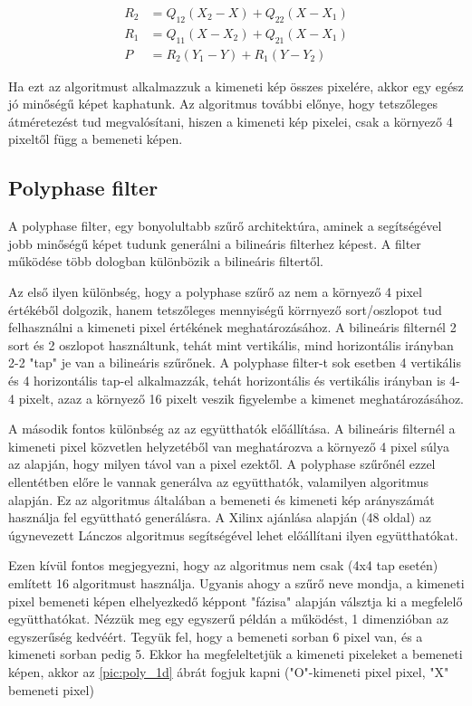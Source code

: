\begin{align}		
	R_2 &= Q_{12} \left(X_2-X\right) + Q_{22} \left(X-X_1\right) \\
	R_1 &= Q_{11} \left(X-X_2\right) + Q_{21} \left(X-X_1\right)\\
	P &= R_2 \left(Y_1-Y\right) + R_1 \left(Y-Y_2\right)
	\label{eq:mult}
\end{align}

Ha ezt az algoritmust alkalmazzuk a kimeneti kép összes pixelére, akkor egy egész jó minőségű képet kaphatunk. Az algoritmus további előnye, hogy tetszőleges átméretezést tud megvalósítani, hiszen a kimeneti kép pixelei, csak a környező 4 pixeltől függ a bemeneti képen.

\subsection{Polyphase filter}

A polyphase filter, egy bonyolultabb szűrő architektúra, aminek a segítségével jobb minőségű képet tudunk generálni a bilineáris filterhez képest. A filter működése több dologban különbözik a bilineáris filtertől. 

Az első ilyen különbség, hogy a polyphase szűrő az nem a környező 4 pixel értékéből dolgozik, hanem tetszőleges mennyiségű körrnyező sort/oszlopot tud felhasználni a kimeneti pixel értékének meghatározásához. A bilineáris filternél 2 sort és 2 oszlopot használtunk, tehát mint vertikális, mind horizontális irányban 2-2 "tap" je van a bilineáris szűrőnek. A polyphase filter-t sok esetben 4 vertikális és 4 horizontális tap-el alkalmazzák, tehát horizontális és vertikális irányban is 4-4 pixelt, azaz a környező 16 pixelt veszik figyelembe a kimenet meghatározásához. 

A második fontos különbség az az együtthatók előállítása. A bilineáris filternél a kimeneti pixel közvetlen helyzetéből van meghatározva a környező 4 pixel súlya az alapján, hogy milyen távol van a pixel ezektől. A polyphase szűrőnél ezzel ellentétben előre le vannak generálva az együtthatók, valamilyen algoritmus alapján. Ez az algoritmus általában a bemeneti és kimeneti kép arányszámát használja fel együttható generálásra. A Xilinx ajánlása alapján \cite{Xilinx_poly} (48 oldal) az úgynevezett Lánczos algoritmus segítségével lehet  előállítani ilyen együtthatókat.

Ezen kívül fontos megjegyezni, hogy az algoritmus nem csak (4x4 tap esetén) említett 16 algoritmust használja. Ugyanis ahogy a szűrő neve mondja, a kimeneti pixel bemeneti képen elhelyezkedő képpont "fázisa" alapján válsztja ki a megfelelő együtthatókat. Nézzük meg egy egyszerű példán a működést, 1 dimenzióban az egyszerűség kedvéért. Tegyük fel, hogy a bemeneti sorban 6 pixel van, és a kimeneti sorban pedig 5. Ekkor ha megfeleltetjük a kimeneti pixeleket a bemeneti képen, akkor az \ref{pic:poly_1d} ábrát fogjuk kapni ("O"-kimeneti pixel pixel, "X" bemeneti pixel)

